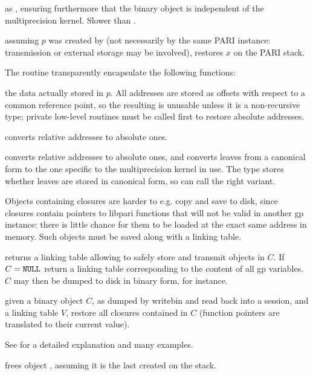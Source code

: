  as , ensuring furthermore
that the binary object is independent of the multiprecision kernel. Slower
than .

 assuming $p$ was created by 
(not necessarily by the same PARI instance: transmission or external storage
may be involved), restores $x$ on the PARI stack.

\noindent The routine  transparently encapsulate the following
functions:

 the  data actually stored in $p$.
All addresses are stored as offsets with respect to a common reference point,
so the resulting  is unusable unless it is a non-recursive type;
private low-level routines must be called first to restore absolute addresses.

 converts relative addresses to
absolute ones.

 converts relative addresses to
absolute ones, and converts leaves from a canonical form to the one
specific to the multiprecision kernel in use. The  type stores
whether leaves are stored in canonical form, so  can call
the right variant.

\noindent Objects containing closures are harder to e.g. copy and save to disk,
since closures contain pointers to libpari functions that will not be valid in
another gp instance: there is little chance for them to be loaded at the exact
same address in memory. Such objects must be saved along with a linking table.

 returns a linking table allowing to safely
store and transmit  objects in $C$.  If $C = {\tt NULL}$ return a
linking table corresponding to the content of all gp variables. $C$ may then be
dumped to disk in binary form, for instance.

 given a binary object $C$, as dumped
by writebin and read back into a session, and a linking table $V$, restore all
closures contained in $C$ (function pointers are translated to their current
value).

See  for a detailed explanation and many examples.

 frees object , assuming it is the last created
on the stack.

